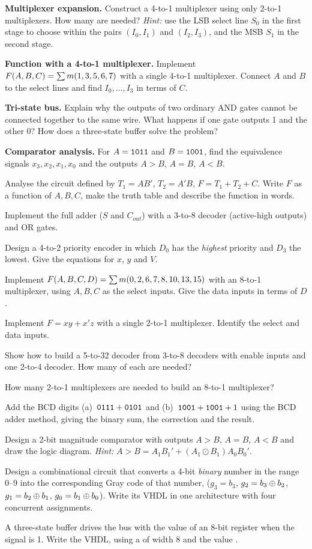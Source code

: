 \begin{exlist}
  \item \textbf{Multiplexer expansion.} Construct a 4-to-1 multiplexer using only 2-to-1 multiplexers. How many are needed? \emph{Hint:} use the LSB select line $S_0$ in the first stage to choose within the pairs $(I_0,I_1)$ and $(I_2,I_3)$, and the MSB $S_1$ in the second stage.
  \item \textbf{Function with a 4-to-1 multiplexer.} Implement $F(A,B,C)=\sum m(1,3,5,6,7)$ with a single 4-to-1 multiplexer. Connect $A$ and $B$ to the select lines and find $I_0,\dots,I_3$ in terms of $C$.
  \item \textbf{Tri-state bus.} Explain why the outputs of two ordinary AND gates cannot be connected together to the same wire. What happens if one gate outputs 1 and the other 0? How does a three-state buffer solve the problem?
  \item \textbf{Comparator analysis.} For $A=\mathtt{1011}$ and $B=\mathtt{1001}$, find the equivalence signals $x_3,x_2,x_1,x_0$ and the outputs $A>B$, $A=B$, $A<B$.
  \item Analyse the circuit defined by $T_1=AB'$, $T_2=A'B$, $F=T_1+T_2+C$. Write $F$ as a function of $A,B,C$, make the truth table and describe the function in words.
  \item Implement the full adder ($S$ and $C_{out}$) with a 3-to-8 decoder (active-high outputs) and OR gates.
  \item Design a 4-to-2 priority encoder in which $D_0$ has the \emph{highest} priority and $D_3$ the lowest. Give the equations for $x$, $y$ and $V$.
  \item Implement $F(A,B,C,D)=\sum m(0,2,6,7,8,10,13,15)$ with an 8-to-1 multiplexer, using $A,B,C$ as the select inputs. Give the data inputs in terms of $D$.
  \item Implement $F=xy+x'z$ with a single 2-to-1 multiplexer. Identify the select and data inputs.
  \item Show how to build a 5-to-32 decoder from 3-to-8 decoders with enable inputs and one 2-to-4 decoder. How many of each are needed?
  \item How many 2-to-1 multiplexers are needed to build an 8-to-1 multiplexer?
  \item Add the BCD digits (a)~$\mathtt{0111}+\mathtt{0101}$ and (b)~$\mathtt{1001}+\mathtt{1001}+1$ using the BCD adder method, giving the binary sum, the correction and the result.
  \item Design a 2-bit magnitude comparator with outputs $A>B$, $A=B$, $A<B$ and draw the logic diagram. \emph{Hint:} $A>B = A_1B_1' + (A_1\odot B_1)A_0B_0'$.
  \item Design a combinational circuit that converts a 4-bit \emph{binary} number in the range 0--9 into the corresponding Gray code of that number, ($g_3=b_3$, $g_2=b_3\oplus b_2$, $g_1=b_2\oplus b_1$, $g_0=b_1\oplus b_0$). Write its VHDL in one architecture with four concurrent assignments.
  \item A three-state buffer drives the bus with the value of an 8-bit register when the signal  is 1. Write the VHDL, using a  of width 8 and the value .
\end{exlist}

